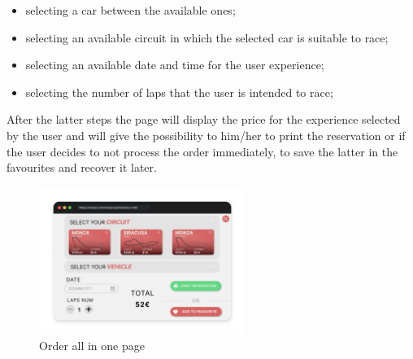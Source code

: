 \begin{itemize}
    \item selecting a car between the available ones;
    \item selecting an available circuit in which the selected car is suitable to race;
    \item selecting an available date and time for the user experience;
    \item selecting the number of laps that the user is intended to race;
\end{itemize}

After the latter steps the page will display the price for the experience selected by the user and will give the possibility to him/her to print the reservation or if the user decides to not process the order immediately, to save the latter in the favourites and recover it later.

\begin{figure}[h]
    \centering
    \includegraphics[width=0.6\textwidth]{mockup/OrderAllInOne.png}
    \caption{Order all in one page}
    \label{fig:allinone}
\end{figure}